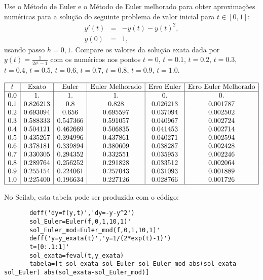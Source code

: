 \begin{exer}Use o Método de Euler e o Método de Euler melhorado para obter aproximações numéricas para a solução do seguinte problema de valor inicial para $t\in[0,1]$:
\begin{eqnarray*}
 y'(t)&=&-y(t)- y(t)^2,\\
 y(0)&=&1,
\end{eqnarray*}
usando passo $h=0,1$. Compare os valores da solução exata dada por $y(t)=\frac{1}{2e^t-1}$ com os numéricos nos pontos $t=0$, $t=0.1$, $t=0.2$, $t=0.3$, $t=0.4$, $t=0.5$, $t=0.6$, $t=0.7$, $t=0.8$, $t=0.9$, $t=1.0$.
\end{exer}
\begin{resp}

 $$\begin{array}{|c|c|c|c|c|c|}
\hline
t &  \hbox{Exato} & \hbox{Euler} & \hbox{Euler Melhorado} & \hbox{Erro Euler} & \hbox{Erro Euler Melhorado}\\
\hline
0.0&    1.          &1.          &1.          &0.          &0.       \\ 
0.1&    0.826213    &0.8         &0.828       &0.026213    &0.001787\\  
0.2&    0.693094    &0.656       &0.695597    &0.037094    &0.002502  \\
0.3&    0.588333    &0.547366    &0.591057    &0.040967    &0.002724  \\
0.4&    0.504121    &0.462669    &0.506835    &0.041453    &0.002714  \\
0.5&    0.435267    &0.394996    &0.437861    &0.040271    &0.002594  \\
0.6&    0.378181    &0.339894    &0.380609    &0.038287    &0.002428  \\
0.7&    0.330305    &0.294352    &0.332551    &0.035953    &0.002246  \\
0.8&    0.289764    &0.256252    &0.291828    &0.033512    &0.002064  \\
0.9&    0.255154    &0.224061    &0.257043    &0.031093    &0.001889  \\
1.0&    0.225400    &0.196634    &0.227126    &0.028766    &0.001726\\

\hline
\end{array}
$$

\ifisscilab
      No Scilab, esta tabela pode ser produzida com o código:
      \begin{verbatim}
       deff('dy=f(y,t)','dy=-y-y^2')
       sol_Euler=Euler(f,0,1,10,1)'
       sol_Euler_mod=Euler_mod(f,0,1,10,1)'
       deff('y=y_exata(t)','y=1/(2*exp(t)-1)')
       t=[0:.1:1]'
       sol_exata=feval(t,y_exata)
       tabela=[t sol_exata sol_Euler sol_Euler_mod abs(sol_exata-sol_Euler) abs(sol_exata-sol_Euler_mod)]
      \end{verbatim}

    \fi
 
\end{resp}


